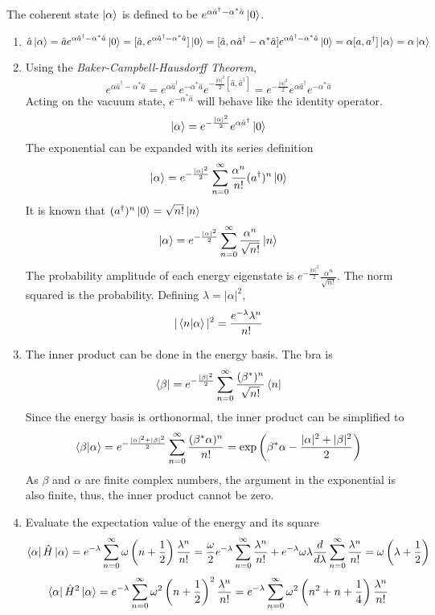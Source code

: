 \begin{sol}
The coherent state $\ket\alpha$ is defined to be $e^{\alpha\hat a^\dagger-\alpha^*\hat a}\ket0$.
\begin{enumerate}[label=\textbf{(\alph*)}]
\item
$$\hat a\ket\alpha=\hat ae^{\alpha\hat a^\dagger-\alpha^*\hat a}\ket0=[\hat a, e^{\alpha\hat a^\dagger-\alpha^*\hat a}]\ket 0=[\hat a, \alpha\hat a^\dagger-\alpha^*\hat a]e^{\alpha\hat a^\dagger-\alpha^*\hat a}\ket0=\alpha[a,a^\dagger]\ket\alpha=\alpha\ket\alpha$$ 
\item
Using the \textit{Baker-Campbell-Hausdorff Theorem},
$$e^{\alpha\hat a^\dagger-\alpha^*\hat a}=e^{\alpha\hat a^\dagger}e^{-\alpha^*\hat a}e^{-\frac{|\alpha|^2}{2}[\hat a, \hat a^\dagger]}=e^{-\frac{|\alpha|^2}{2}}e^{\alpha\hat a^\dagger}e^{-\alpha^*\hat a}$$
Acting on the vacuum state, $e^{-\alpha^*\hat a}$ will behave like the identity operator. 
$$\ket\alpha=e^{-\frac{|\alpha|^2}{2}}e^{\alpha\hat a^\dagger}\ket0$$
The exponential can be expanded with its series definition
$$\ket\alpha=e^{-\frac{|\alpha|^2}{2}}\sum_{n=0}^\infty \frac{\alpha^n }{n!}(a^\dagger)^n\ket 0$$ 
It is known that $(a^\dagger)^n\ket 0=\sqrt{n!}\ket n$ 
$$\ket\alpha=e^{-\frac{|\alpha|^2}{2}}\sum_{n=0}^\infty \frac{\alpha^n }{\sqrt{n!}}\ket n$$ 
The probability amplitude of each energy eigenstate is $e^{-\frac{|\alpha|^2}{2}}\frac{\alpha^n }{\sqrt{n!}}$. The norm squared is the probability. Defining $\lambda=|\alpha|^2$,
$$|\braket{n}{\alpha}|^2=\frac{e^{-\lambda}\lambda^n}{n!}$$
\item
The inner product can be done in the energy basis. The bra is
$$\bra\beta=e^{-\frac{|\beta|^2}{2}}\sum_{n=0}^\infty\frac{(\beta^*)^n}{\sqrt{n!}}\bra n$$  
Since the energy basis is orthonormal, the inner product can be simplified to
$$\braket{\beta}{\alpha}=e^{-\frac{|\alpha|^2+|\beta|^2}{2}}\sum_{n=0}^\infty\frac{(\beta^*\alpha)^n}{n!}=\exp\left(\beta^*\alpha-\frac{|\alpha|^2+|\beta|^2}{2}\right)$$ As $\beta$ and $\alpha$ are finite complex numbers, the argument in the exponential is also finite, thus, the inner product cannot be zero.
\item
Evaluate the expectation value of the energy and its square
$$\bra\alpha\hat H\ket\alpha=e^{-\lambda}\sum_{n=0}^\infty\omega\left(n+\frac{1}{2}\right)\frac{\lambda^n}{n!}=\frac{\omega}{2}e^{-\lambda}\sum_{n=0}^\infty\frac{\lambda^n}{n!}+e^{-\lambda}\omega\lambda\frac{d}{d\lambda}\sum_{n=0}^\infty\frac{\lambda^n}{n!}=\omega\left(\lambda+\frac{1}{2}\right)$$
$$\bra\alpha\hat H^2\ket\alpha=e^{-\lambda}\sum_{n=0}^\infty\omega^2\left(n+\frac{1}{2}\right)^2\frac{\lambda^n}{n!}=e^{-\lambda}\sum_{n=0}^\infty\omega^2\left(n^2+n+\frac{1}{4}\right)\frac{\lambda^n}{n!}$$ 

\end{enumerate}
\end{sol}
